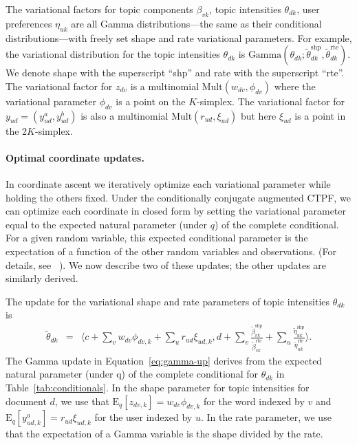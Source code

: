 \documentclass{article}
\newcommand{\myeq}[1]{Equation~\ref{eq:#1}}
\newcommand{\mytab}[1]{Table~\ref{tab:#1}}
\newcommand{\E}{\textrm{E}}
\newcommand{\shape}{\textrm{shp}}
\newcommand{\rate}{\textrm{rte}}
\newcommand{\gam}{\textrm{Gamma}}
\newcommand{\vshape}[2]{\tilde{#1}_{#2}^{\shape}}
\newcommand{\vrate}[2]{\tilde{#1}_{#2}^{\rate}}
\newcommand{\mult}{\textrm{Mult}}
\begin{document}
The variational factors for topic components $\beta_{vk}$, topic
intensities $\theta_{dk}$, user preferences $\eta_{uk}$ are all Gamma
distributions---the same as their conditional distributions---with
freely set shape and rate variational parameters. For example, the
variational distribution for the topic intensities $\theta_{dk}$ is
$\gam(\theta_{dk}; \vshape{\theta}{dk}, \vrate{\theta}{dk})$. We
denote shape with the superscript ``shp'' and rate with the
superscript ``rte''. The variational factor for $z_{dv}$ is a
multinomial $\mult(w_{dv}, \phi_{dv})$ where the variational parameter
$\phi_{dv}$ is a point on the $K$-simplex. The variational factor for
$y_{ud} = (y_{ud}^a,y_{ud}^b)$ is also a multinomial $\mult(r_{ud},
\xi_{ud})$ but here $\xi_{ud}$ is a point in the $2K$-simplex.

\paragraph{Optimal coordinate updates.}
In coordinate ascent we iteratively optimize each variational
parameter while holding the others fixed. Under the conditionally
conjugate augmented CTPF, we can optimize each coordinate in closed
form by setting the variational parameter equal to the expected
natural parameter (under $q$) of the complete conditional. For a given
random variable, this expected conditional parameter is the
expectation of a function of the other random variables and
observations. (For details, see ~\cite{Gopalan:2013b,
  Hoffman:2013}). We now describe two of these updates; the other
updates are similarly derived.

The update for the variational shape and rate parameters of topic
intensities $\theta_{dk}$ is
\begin{eqnarray}
  \tilde{\theta}_{dk} &=& \langle c + \textstyle \sum_{v} w_{dv}
  \phi_{dv,k} + \sum_{u} r_{ud} \xi_{ud,k},
  d + \textstyle \sum_v \frac{\vshape{\beta}{vk}}{\vrate{\beta}{vk}} + \sum_u
  \frac{\vshape{\eta}{uk}}{\vrate{\eta}{uk}} \rangle.
\label{eq:gamma-up}
\end{eqnarray}
The Gamma update in \myeq{gamma-up} derives from the expected natural
parameter (under q) of the complete conditional for $\theta_{dk}$ in
\mytab{conditionals}. In the shape parameter for topic intensities for
document $d$, we use that $\E_q[z_{dv,k}] = w_{dv} \phi_{dv,k}$ for
the word indexed by $v$ and $\E_q[y_{ud,k}^{a}] = r_{ud}\xi_{ud,k}$
for the user indexed by $u$. In the rate parameter, we use that the
expectation of a Gamma variable is the shape divided by the rate.
\end{document}
